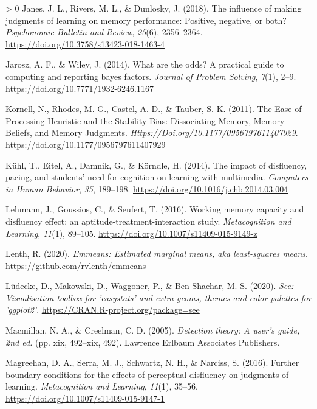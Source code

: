 \documentclass[
  english,
  jou]{apa7}
\newlength{\cslhangindent}
\newenvironment{CSLReferences}[3] %
 {%
  \setlength{\parindent}{0pt}
  \ifodd #1 \everypar{\setlength{\hangindent}{\cslhangindent}}\ignorespaces\fi
  \ifnum #2 > 0
  \setlength{\parskip}{#2\baselineskip}
  \fi
 }%
 {}
\begin{document}
\begin{CSLReferences}{1}{0}
\leavevmode\hypertarget{ref-Janes2018}{}%
Janes, J. L., Rivers, M. L., \& Dunlosky, J. (2018). {The influence of making judgments of learning on memory performance: Positive, negative, or both?} \emph{Psychonomic Bulletin and Review}, \emph{25}(6), 2356--2364. \url{https://doi.org/10.3758/s13423-018-1463-4}

\leavevmode\hypertarget{ref-Jarosz2014}{}%
Jarosz, A. F., \& Wiley, J. (2014). {What are the odds? A practical guide to computing and reporting bayes factors}. \emph{Journal of Problem Solving}, \emph{7}(1), 2--9. \url{https://doi.org/10.7771/1932-6246.1167}

\leavevmode\hypertarget{ref-Kornell2011}{}%
Kornell, N., Rhodes, M. G., Castel, A. D., \& Tauber, S. K. (2011). {The Ease-of-Processing Heuristic and the Stability Bias: Dissociating Memory, Memory Beliefs, and Memory Judgments}. \emph{Https://Doi.org/10.1177/0956797611407929}. \url{https://doi.org/10.1177/0956797611407929}

\leavevmode\hypertarget{ref-Kuhl2014}{}%
Kühl, T., Eitel, A., Damnik, G., \& Körndle, H. (2014). {The impact of disfluency, pacing, and students' need for cognition on learning with multimedia}. \emph{Computers in Human Behavior}, \emph{35}, 189--198. \url{https://doi.org/10.1016/j.chb.2014.03.004}

\leavevmode\hypertarget{ref-Lehmann2016}{}%
Lehmann, J., Goussios, C., \& Seufert, T. (2016). {Working memory capacity and disfluency effect: an aptitude-treatment-interaction study}. \emph{Metacognition and Learning}, \emph{11}(1), 89--105. \url{https://doi.org/10.1007/s11409-015-9149-z}

\leavevmode\hypertarget{ref-R-emmeans}{}%
Lenth, R. (2020). \emph{Emmeans: Estimated marginal means, aka least-squares means}. \url{https://github.com/rvlenth/emmeans}

\leavevmode\hypertarget{ref-R-see}{}%
Lüdecke, D., Makowski, D., Waggoner, P., \& Ben-Shachar, M. S. (2020). \emph{See: Visualisation toolbox for 'easystats' and extra geoms, themes and color palettes for 'ggplot2'}. \url{https://CRAN.R-project.org/package=see}

\leavevmode\hypertarget{ref-Macmillan2005}{}%
Macmillan, N. A., \& Creelman, C. D. (2005). \emph{{Detection theory: A user's guide, 2nd ed.}} (pp. xix, 492--xix, 492). Lawrence Erlbaum Associates Publishers.

\leavevmode\hypertarget{ref-Magreehan2016}{}%
Magreehan, D. A., Serra, M. J., Schwartz, N. H., \& Narciss, S. (2016). {Further boundary conditions for the effects of perceptual disfluency on judgments of learning}. \emph{Metacognition and Learning}, \emph{11}(1), 35--56. \url{https://doi.org/10.1007/s11409-015-9147-1}


\end{CSLReferences}
\end{document}
